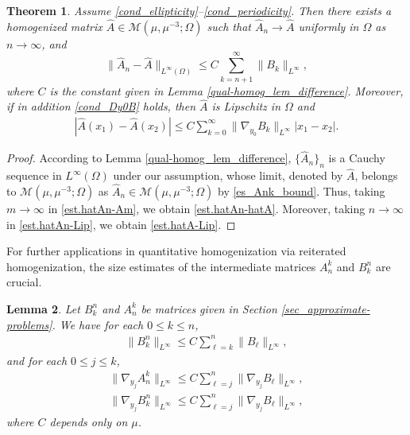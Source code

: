 \documentclass[reqno,12pt]{amsart} %
\newtheorem{theorem}{Theorem}[section]
\newtheorem{lemma}[theorem]{Lemma}
\theoremstyle{definition}
\theoremstyle{remark}
\newtheorem{remark}[theorem]{Remark}
\numberwithin{equation}{section}
\newcommand{\M}{\mathcal{M}}
\newcommand{\jz}[1]{\textcolor{red}{#1}}
\begin{document}
\begin{theorem}\label{qual-homog_thm_hatA}
    Assume \eqref{cond_ellipticity}--\eqref{cond_periodicity}. Then there exists a homogenized matrix $\widehat{A} \in \M(\mu,\mu^{-3};\Omega)$ such that $\widehat{A}_n \to \widehat{A}$ uniformly in $\Omega$ as $n\to \infty$, and
    \begin{equation}\label{est.hatAn-hatA}
        \| \widehat{A}_n - \widehat{A} \|_{L^\infty(\Omega)} \le C \sum_{k=n+1}^\infty \|B_k\|_{L^\infty},
    \end{equation}
where $C$ is the constant given in Lemma \ref{qual-homog_lem_difference}.   
Moreover, if in addition \eqref{cond_Dy0B} holds,
then $\widehat{A}$ is Lipschitz in $\Omega$ and
    \begin{align}\label{est.hatA-Lip}
      |\widehat{A}(x_1)-\widehat{A}(x_2)|\leq C\sum_{k=0}^\infty\|\nabla_{y_0}B_k\|_{L^\infty}|x_1-x_2|. 
    \end{align}
  \end{theorem}
\begin{proof}
    According to Lemma \ref{qual-homog_lem_difference}, $\{\widehat{A}_n\}_n$ is a Cauchy sequence in $L^\infty(\Omega)$ under our assumption, whose limit, denoted by $\widehat{A}$, belongs to $\M(\mu,\mu^{-3};\Omega)$ as $\widehat{A}_n\in \M(\mu,\mu^{-3};\Omega)$ by \eqref{es_Ank_bound}. Thus, taking $m\to\infty$ in \eqref{est.hatAn-Am}, we obtain \eqref{est.hatAn-hatA}. Moreover, taking $n\to \infty$ in \eqref{est.hatAn-Lip}, we obtain \eqref{est.hatA-Lip}. 
\end{proof}

For further applications in quantitative homogenization via reiterated homogenization, the size estimates of the intermediate matrices $A^k_n$ and $B^n_k$ are crucial.
  \begin{lemma}\label{qual-homog_lemma_bkn}
  Let $B_k^n$ and $A_n^k$ be matrices given in Section \ref{sec_approximate-problems}. We have for each $0\leq k\leq n$,
  \begin{align}\label{est.Bnk.Linfty}
    \|B_k^n\|_{L^\infty}\leq C\sum_{\ell=k}^n\|B_\ell\|_{L^\infty},
  \end{align}
  and for each $0\leq j\leq k$,
  \begin{align}
    \|\nabla_{y_j}A_n^k\|_{L^\infty}\leq C\sum_{\ell=j}^n\|\nabla_{y_j}B_\ell\|_{L^\infty},\nonumber\\
    \|\nabla_{y_j}B_k^n\|_{L^\infty}\leq C\sum_{\ell=j}^n\|\nabla_{y_j}B_\ell\|_{L^\infty}, \label{est.DjBnk.Linfty}
  \end{align}
  where $C$ depends only on $\mu$. 
\end{lemma}
\end{document}
